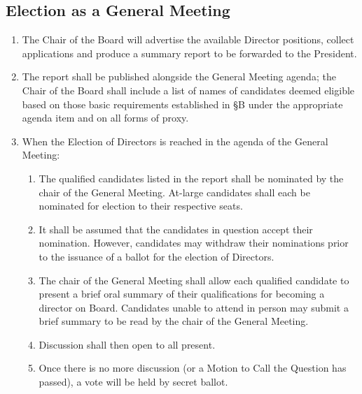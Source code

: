 \subsection{Election as a General Meeting}
\begin{enumerate}
    \item The Chair of the Board will advertise the available Director positions, collect applications
        and produce a summary report to be forwarded to the President. 
    \item The report shall be published alongside the General Meeting agenda; the Chair of the Board
        shall include a list of names of candidates deemed eligible based on those basic requirements 
        established in §B under the appropriate agenda item and on all forms of proxy.
    \item When the Election of Directors is reached in the agenda of the General Meeting:
    \begin{enumerate}
        \item The qualified candidates listed in the report shall be nominated by the chair of the General Meeting. 
            At-large candidates shall each be nominated for election to their respective seats.
        \item It shall be assumed that the candidates in question accept their nomination. 
            However, candidates may withdraw their nominations prior to the issuance of a ballot for the election of Directors.
        \item The chair of the General Meeting shall allow each qualified candidate to present a brief oral 
            summary of their qualifications for becoming a director on Board.  
            Candidates unable to attend in person may submit a brief summary to be read by the 
            chair of the General Meeting.
        \item Discussion shall then open to all present.
        \item Once there is no more discussion (or a Motion to Call the Question has passed), a vote will be held by secret ballot.


\end{enumerate}
\end{enumerate}
